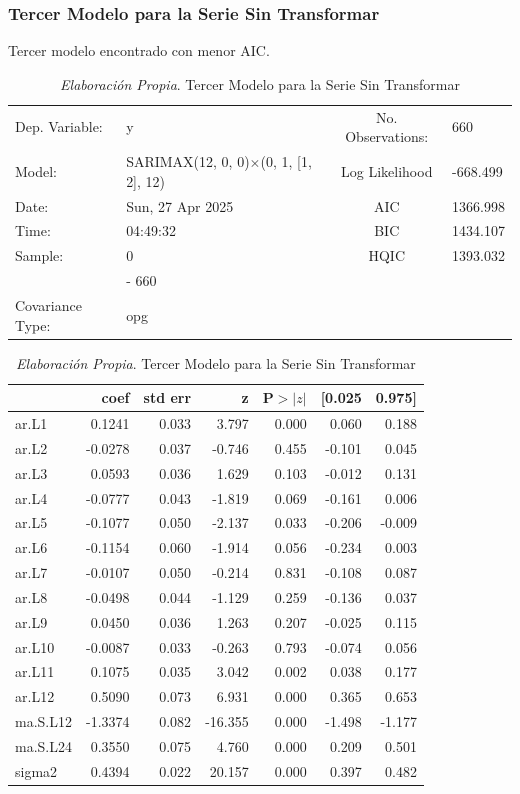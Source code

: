 \documentclass[12pt,letterpaper]{article}   %
\begin{document}
\newpage


\subsubsection{Tercer Modelo para la Serie Sin Transformar}

Tercer modelo encontrado con menor AIC.

\begin{table}[htbp]
\centering
\tiny
\caption{\textit{Elaboración Propia}. Tercer Modelo para la Serie Sin Transformar}
\begin{tabular}{llcl}
\toprule
Dep. Variable: & y & No. Observations: & 660 \\
Model: & SARIMAX(12, 0, 0)$\times$(0, 1, [1, 2], 12) & Log Likelihood & -668.499 \\
Date: & Sun, 27 Apr 2025 & AIC & 1366.998 \\
Time: & 04:49:32 & BIC & 1434.107 \\
Sample: & 0 & HQIC & 1393.032 \\
        & - 660 & & \\
Covariance Type: & opg & & \\
\bottomrule
\end{tabular}

\vspace{0.3cm}

\begin{tabular}{lrrrrrr}
\toprule
 & \textbf{coef} & \textbf{std err} & \textbf{z} & \textbf{P$>|z|$} & \textbf{[0.025} & \textbf{0.975]} \\
\midrule
ar.L1     & 0.1241 & 0.033 & 3.797  & 0.000 & 0.060 & 0.188 \\
ar.L2     & -0.0278 & 0.037 & -0.746 & 0.455 & -0.101 & 0.045 \\
ar.L3     & 0.0593 & 0.036 & 1.629  & 0.103 & -0.012 & 0.131 \\
ar.L4     & -0.0777 & 0.043 & -1.819 & 0.069 & -0.161 & 0.006 \\
ar.L5     & -0.1077 & 0.050 & -2.137 & 0.033 & -0.206 & -0.009 \\
ar.L6     & -0.1154 & 0.060 & -1.914 & 0.056 & -0.234 & 0.003 \\
ar.L7     & -0.0107 & 0.050 & -0.214 & 0.831 & -0.108 & 0.087 \\
ar.L8     & -0.0498 & 0.044 & -1.129 & 0.259 & -0.136 & 0.037 \\
ar.L9     & 0.0450 & 0.036 & 1.263  & 0.207 & -0.025 & 0.115 \\
ar.L10    & -0.0087 & 0.033 & -0.263 & 0.793 & -0.074 & 0.056 \\
ar.L11    & 0.1075 & 0.035 & 3.042  & 0.002 & 0.038 & 0.177 \\
ar.L12    & 0.5090 & 0.073 & 6.931  & 0.000 & 0.365 & 0.653 \\
ma.S.L12  & -1.3374 & 0.082 & -16.355 & 0.000 & -1.498 & -1.177 \\
ma.S.L24  & 0.3550 & 0.075 & 4.760  & 0.000 & 0.209 & 0.501 \\
sigma2    & 0.4394 & 0.022 & 20.157 & 0.000 & 0.397 & 0.482 \\
\bottomrule
\end{tabular}


\end{table}
\end{document}
